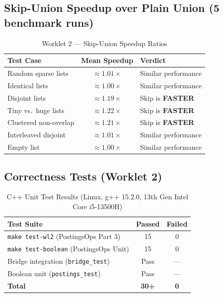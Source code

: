 \documentclass[12pt]{article}
\begin{document}
\subsection*{Skip-Union Speedup over Plain Union (5 benchmark runs)}

\begin{table}[H]
\centering
\caption{Worklet 2 --- Skip-Union Speedup Ratios}
\begin{tabular}{|p{5cm}|c|p{8.5cm}|}
\hline
\textbf{Test Case} & \textbf{Mean Speedup} & \textbf{Verdict} \\
\hline
Random sparse lists    & $\approx 1.01\times$ & Similar performance \\
Identical lists        & $\approx 1.00\times$ & Similar performance \\
Disjoint lists         & $\approx 1.19\times$ & Skip is \textbf{FASTER} \\
Tiny vs.\ huge lists   & $\approx 1.22\times$ & Skip is \textbf{FASTER} \\
Clustered non-overlap  & $\approx 1.21\times$ & Skip is \textbf{FASTER} \\
Interleaved disjoint   & $\approx 1.01\times$ & Similar performance \\
Empty list             & $\approx 1.00\times$ & Similar performance \\
\hline
\end{tabular}
\end{table}

\subsection*{Correctness Tests (Worklet 2)}

\begin{table}[H]
\centering
\caption{C++ Unit Test Results (Linux, g++ 15.2.0, 13th Gen Intel Core i5-13500H)}
\begin{tabular}{|l|c|c|}
\hline
\textbf{Test Suite}                           & \textbf{Passed} & \textbf{Failed} \\
\hline
\texttt{make test-wl2} (PostingsOps Part 3)   & 15              & 0 \\
\texttt{make test-boolean} (PostingsOps Unit) & 15              & 0 \\
Bridge integration (\texttt{bridge\_test})    & Pass            & --- \\
Boolean unit (\texttt{postings\_test})        & Pass            & --- \\
\hline
\textbf{Total}                                & \textbf{30+}    & \textbf{0} \\
\hline
\end{tabular}
\end{table}
\end{document}
